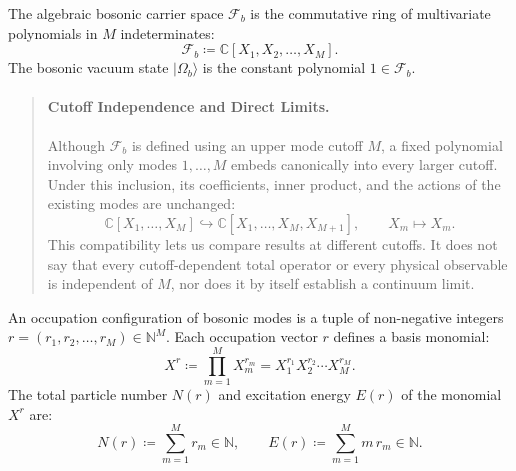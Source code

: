 \begin{definition}
The algebraic bosonic carrier space $\mathcal{F}_b$ is the commutative ring of multivariate polynomials in $M$ indeterminates:
\begin{equation}
\mathcal{F}_b \coloneqq \mathbb{C}[X_1, X_2, \dots, X_M].
\end{equation}
The bosonic vacuum state $|\Omega_b\rangle$ is the constant polynomial $1 \in \mathcal{F}_b$.
\end{definition}

\begin{quote}
\item[]\paragraph{Cutoff Independence and Direct Limits.}
Although $\mathcal{F}_b$ is defined using an upper mode cutoff $M$, a fixed polynomial involving only modes $1,\dots,M$ embeds canonically into every larger cutoff. Under this inclusion, its coefficients, inner product, and the actions of the existing modes are unchanged:
\begin{equation}
\mathbb{C}[X_1, \dots, X_M] \hookrightarrow \mathbb{C}[X_1, \dots, X_M, X_{M+1}], \qquad X_m \mapsto X_m.
\end{equation}
This compatibility lets us compare results at different cutoffs. It does not say that every cutoff-dependent total operator or every physical observable is independent of $M$, nor does it by itself establish a continuum limit.

\end{quote}

\begin{definition}
An occupation configuration of bosonic modes is a tuple of non-negative integers $r = (r_1, r_2, \dots, r_M) \in \mathbb{N}^M$. Each occupation vector $r$ defines a basis monomial:
\begin{equation}
X^r \coloneqq \prod_{m=1}^M X_m^{r_m} = X_1^{r_1} X_2^{r_2} \cdots X_M^{r_M}.
\end{equation}
The total particle number $N(r)$ and excitation energy $E(r)$ of the monomial $X^r$ are:
\begin{equation}
N(r) \coloneqq \sum_{m=1}^M r_m \in \mathbb{N}, \qquad E(r) \coloneqq \sum_{m=1}^M m\, r_m \in \mathbb{N}.
\end{equation}
\end{definition}

